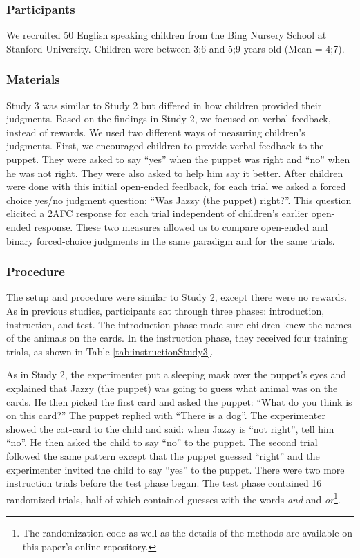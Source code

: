 \documentclass[floatsintext,man]{apa6}
\theoremstyle{definition}
\theoremstyle{definition}
\theoremstyle{definition}
\theoremstyle{remark}
\begin{document}
\subsubsection{Participants}\label{participants-2}

We recruited 50 English speaking children from the Bing Nursery School
at Stanford University. Children were between 3;6 and 5;9 years old
(Mean = 4;7).

\subsubsection{Materials}\label{materials-1}

Study 3 was similar to Study 2 but differed in how children provided
their judgments. Based on the findings in Study 2, we focused on verbal
feedback, instead of rewards. We used two different ways of measuring
children's judgments. First, we encouraged children to provide verbal
feedback to the puppet. They were asked to say \enquote{yes} when the
puppet was right and \enquote{no} when he was not right. They were also
asked to help him say it better. After children were done with this
initial open-ended feedback, for each trial we asked a forced choice
yes/no judgment question: \enquote{Was Jazzy (the puppet) right?}. This
question elicited a 2AFC response for each trial independent of
children's earlier open-ended response. These two measures allowed us to
compare open-ended and binary forced-choice judgments in the same
paradigm and for the same trials.

\subsubsection{Procedure}\label{procedure-2}

The setup and procedure were similar to Study 2, except there were no
rewards. As in previous studies, participants sat through three phases:
introduction, instruction, and test. The introduction phase made sure
children knew the names of the animals on the cards. In the instruction
phase, they received four training trials, as shown in Table
\ref{tab:instructionStudy3}.

As in Study 2, the experimenter put a sleeping mask over the puppet's
eyes and explained that Jazzy (the puppet) was going to guess what
animal was on the cards. He then picked the first card and asked the
puppet: \enquote{What do you think is on this card?} The puppet replied
with \enquote{There is a dog}. The experimenter showed the cat-card to
the child and said: when Jazzy is \enquote{not right}, tell him
\enquote{no}. He then asked the child to say \enquote{no} to the puppet.
The second trial followed the same pattern except that the puppet
guessed \enquote{right} and the experimenter invited the child to say
\enquote{yes} to the puppet. There were two more instruction trials
before the test phase began. The test phase contained 16 randomized
trials, half of which contained guesses with the words \emph{and} and
\emph{or}\footnote{The randomization code as well as the details of the
  methods are available on this paper's online repository.}.
\end{document}

